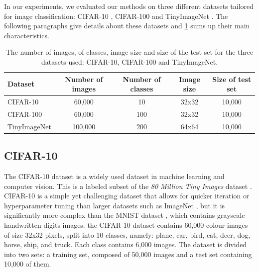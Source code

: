 In our experiments, we evaluated our methods on three different datasets
tailored for image classification: CIFAR-10 \cite{CIFARdataset}, CIFAR-100
\cite{CIFARdataset} and TinyImageNet \cite{TinyImageNet}. The following
paragraphs give details about these datasets and \cref{tab:dlo:datasets} sums
up their main characteristics.\\

\begin{table}[ht!]
  \centering
  \begin{tabular}{lcccc}
    \toprule
    \textbf{Dataset}    & \textbf{Number of images} & \textbf{Number of classes} &
    \textbf{Image size} & \textbf{Size of test set}                                               \\
    \hline
    CIFAR-10            & 60,000                    & 10                         & 32x32 & 10,000 \\
    CIFAR-100           & 60,000                    & 100                        & 32x32 & 10,000 \\
    TinyImageNet        & 100,000                   & 200                        & 64x64 & 10,000 \\
    \bottomrule
  \end{tabular}
  \caption{The number of images, of classes, image size and size of the test
    set for the three datasets used: CIFAR-10, CIFAR-100 and TinyImageNet.}
  \label{tab:dlo:datasets}
\end{table}

\subsection{CIFAR-10}

The CIFAR-10 dataset \cite{CIFARdataset} is a widely used dataset in machine
learning and computer vision. This is a labeled subset of the \emph{80 Million
Tiny Images} dataset \cite{4531741}. CIFAR-10 is a simple yet challenging
dataset that allows for quicker iteration or hyperparameter tuning than larger
datasets such as ImageNet \cite{DBLP:journals/ijcv/RussakovskyDSKS15}, but it is
significantly more complex than the MNIST dataset \cite{6296535}, which contains
grayscale handwritten digits images. the CIFAR-10 dataset contains 60,000 colour
images of size 32x32 pixels, split into 10 classes, namely: plane, car, bird,
cat, deer, dog, horse, ship, and truck. Each class contains 6,000 images. The
dataset is divided into two sets: a training set, composed of 50,000 images and
a test set containing 10,000 of them.\\

